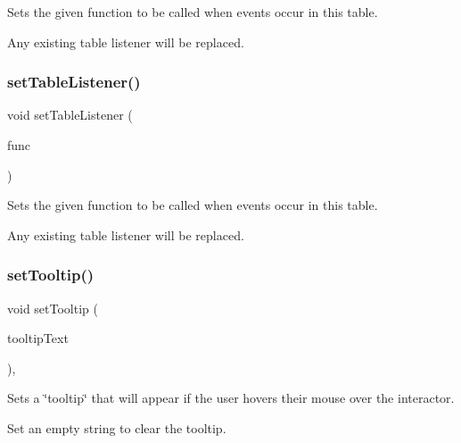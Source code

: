 Sets the given function to be called when events occur in this table. 

Any existing table listener will be replaced. \mbox{\label{classGTable_a0412cb4e079085ed5cb3bcdf2921ac84}} 
\subsubsection{\texorpdfstring{set\+Table\+Listener()}{setTableListener()}\hspace{0.1cm}{\footnotesize\ttfamily [2/2]}}
{\footnotesize\ttfamily void set\+Table\+Listener (\begin{DoxyParamCaption}\item[{G\+Event\+Listener\+Void}]{func }\end{DoxyParamCaption})\hspace{0.3cm}{\ttfamily [virtual]}}



Sets the given function to be called when events occur in this table. 

Any existing table listener will be replaced. \mbox{\label{classGInteractor_a039e0e49beaecc275efce02d416acea8}} 
\subsubsection{\texorpdfstring{set\+Tooltip()}{setTooltip()}}
{\footnotesize\ttfamily void set\+Tooltip (\begin{DoxyParamCaption}\item[{const std\+::string \&}]{tooltip\+Text }\end{DoxyParamCaption})\hspace{0.3cm}{\ttfamily [virtual]}, {\ttfamily [inherited]}}



Sets a \char`\"{}tooltip\char`\"{} that will appear if the user hovers their mouse over the interactor. 

Set an empty string to clear the tooltip. \mbox{\label{classGInteractor_a18e44e30b31525a243960ca3928125aa}} 
